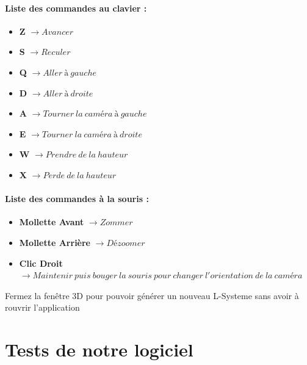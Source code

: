 \paragraph{Liste des commandes au clavier : }
\begin{itemize}
    \item \textbf{Z} $\xrightarrow{} Avancer$
    \item \textbf{S} $\xrightarrow{} Reculer$
    \item \textbf{Q} $\xrightarrow{} Aller \ à \ gauche$
    \item \textbf{D} $\xrightarrow{} Aller \ à \ droite$
    \item \textbf{A} $\xrightarrow{} Tourner \ la \ caméra \ à \ gauche$
    \item \textbf{E} $\xrightarrow{} Tourner \ la \ caméra \ à \ droite$
    \item \textbf{W} $\xrightarrow{} Prendre \ de \ la \ hauteur$
    \item \textbf{X} $\xrightarrow{} Perde \ de \ la \ hauteur$
\end{itemize}
\paragraph{Liste des commandes à la souris :}
\begin{itemize}
    \item \textbf{Mollette Avant} $\xrightarrow{} Zommer$
    \item \textbf{Mollette Arrière} $\xrightarrow{} Dézoomer$
    \item \textbf{Clic Droit} $\xrightarrow{} Maintenir \ puis \ bouger \ la \ souris \ pour \ changer \ l'orientation \ de \ la \ caméra$

\end{itemize}


Fermez la fenêtre 3D pour pouvoir générer un nouveau L-Systeme sans avoir à rouvrir l'application

\section{Tests de notre logiciel}

